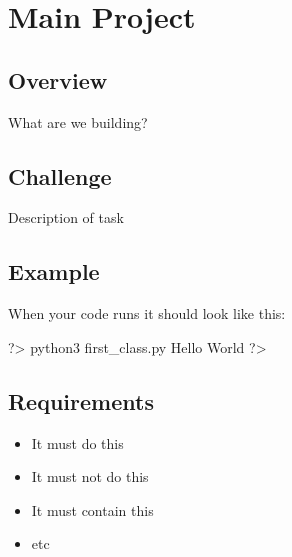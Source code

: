 \documentclass{42-en}
\begin{document}

\nextexercice


\chapter{Main Project}

\section{Overview}

What are we building?

\section{Challenge}


\makeheaderfiles
Description of task\\

\section{Example}
When your code runs it should look like this: 

\begin{42console}
	?> python3 first_class.py
	Hello World
	?>
\end{42console}


\section{Requirements}
\begin{itemize}
	\item It must do this
    \item It must not do this
    \item It must contain this
    \item etc
\end{itemize}


\nextexercice
\end{document}
